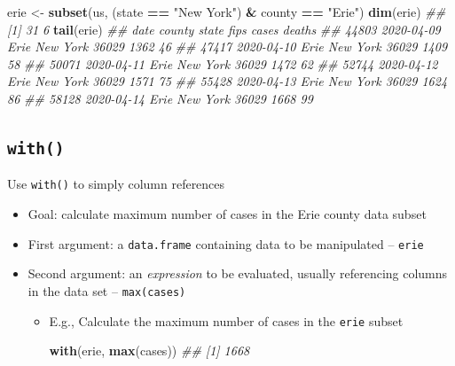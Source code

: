 \documentclass[]{book}
\newenvironment{Shaded}{\begin{snugshade}}{\end{snugshade}}
\newcommand{\CommentTok}[1]{\textcolor[rgb]{0.56,0.35,0.01}{\textit{#1}}}
\newcommand{\KeywordTok}[1]{\textcolor[rgb]{0.13,0.29,0.53}{\textbf{#1}}}
\newcommand{\NormalTok}[1]{#1}
\newcommand{\OperatorTok}[1]{\textcolor[rgb]{0.81,0.36,0.00}{\textbf{#1}}}
\newcommand{\StringTok}[1]{\textcolor[rgb]{0.31,0.60,0.02}{#1}}
\begin{document}
\begin{itemize}
\begin{Shaded}
\begin{Highlighting}[]
\NormalTok{erie <-}\StringTok{ }\KeywordTok{subset}\NormalTok{(us, (state }\OperatorTok{==}\StringTok{ "New York"}\NormalTok{) }\OperatorTok{&}\StringTok{ }\NormalTok{county }\OperatorTok{==}\StringTok{ "Erie"}\NormalTok{)}
\KeywordTok{dim}\NormalTok{(erie)}
\CommentTok{## [1] 31  6}
\KeywordTok{tail}\NormalTok{(erie)}
\CommentTok{##             date county    state  fips cases deaths}
\CommentTok{## 44803 2020-04-09   Erie New York 36029  1362     46}
\CommentTok{## 47417 2020-04-10   Erie New York 36029  1409     58}
\CommentTok{## 50071 2020-04-11   Erie New York 36029  1472     62}
\CommentTok{## 52744 2020-04-12   Erie New York 36029  1571     75}
\CommentTok{## 55428 2020-04-13   Erie New York 36029  1624     86}
\CommentTok{## 58128 2020-04-14   Erie New York 36029  1668     99}
\end{Highlighting}
\end{Shaded}
\end{itemize}

\hypertarget{with}{%
\subsection*{\texorpdfstring{\texttt{with()}}{with()}}\label{with}}

Use \texttt{with()} to simply column references

\begin{itemize}
\item
  Goal: calculate maximum number of cases in the Erie county data subset
\item
  First argument: a \texttt{data.frame} containing data to be manipulated -- \texttt{erie}
\item
  Second argument: an \emph{expression} to be evaluated, usually referencing columns in the data set -- \texttt{max(cases)}

  \begin{itemize}
  \item
    E.g., Calculate the maximum number of cases in the \texttt{erie} subset

\begin{Shaded}
\begin{Highlighting}[]
\KeywordTok{with}\NormalTok{(erie, }\KeywordTok{max}\NormalTok{(cases))}
\CommentTok{## [1] 1668}
\end{Highlighting}
\end{Shaded}
  \end{itemize}
\end{itemize}
\end{document}

